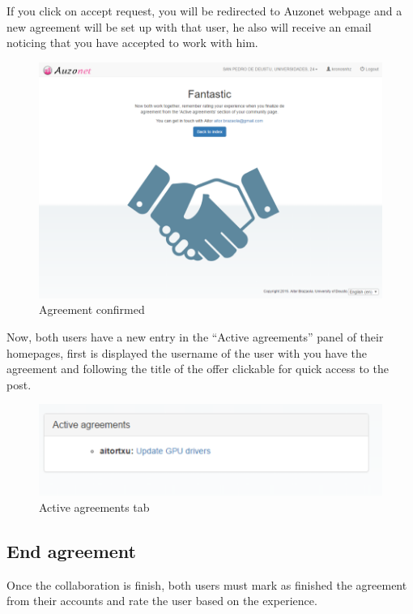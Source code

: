 \documentclass{DeustoFDP}
\begin{document}
If you click on accept request, you will be redirected to Auzonet webpage and a new agreement will be set up with that user, he also will receive an email noticing that you have accepted to work with him.

\begin{figure}[h!]
\centering
\includegraphics[width=0.9\linewidth]{fig/Manual/confirmedagreement}
\caption[Agreement confirmed]{Agreement confirmed}
\label{fig:confirmedagreement}
\end{figure}


Now, both users have a new entry in the “Active agreements” panel of their homepages, first is displayed the username of the user with you have the agreement and following the title of the offer clickable for quick access to the post.

\begin{figure}[h!]
\centering
\includegraphics[width=0.9\linewidth]{fig/Manual/activeagreements}
\caption[Active agreements tab]{Active agreements tab}
\label{fig:activeagreements}
\end{figure}

\newpage
\subsection{End agreement}
Once the collaboration is finish, both users must mark as finished the agreement from their accounts and rate the user based on the experience.
\end{document}
